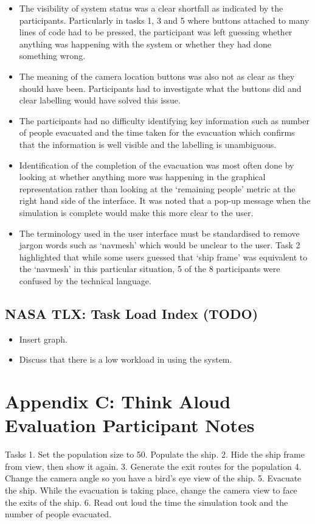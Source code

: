 \begin{itemize}
\item The visibility of system status was a clear shortfall as indicated by the participants. Particularly in tasks 1, 3 and 5 where buttons attached to many lines of code had to be pressed, the participant was left guessing whether anything was happening with the system or whether they had done something wrong.
\item The meaning of the camera location buttons was also not as clear as they should have been. Participants had to investigate what the buttons did and clear labelling would have solved this issue.
\item The participants had no difficulty identifying key information such as number of people evacuated and the time taken for the evacuation which confirms that the information is well visible and the labelling is unambiguous.
\item Identification of the completion of the evacuation was most often done by looking at whether anything more was happening in the graphical representation rather than looking at the `remaining people' metric at the right hand side of the interface. It was noted that a pop-up message when the simulation is complete would make this more clear to the user.
\item The terminology used in the user interface must be standardised to remove jargon words such as ‘navmesh’ which would be unclear to the user. Task 2 highlighted that while some users guessed that ‘ship frame’ was equivalent to the ‘navmesh’ in this particular situation, 5 of the 8 participants were confused by the technical language. 
\end{itemize}

\subsection{NASA TLX: Task Load Index (TODO)}
\begin{itemize}
\item Insert graph.
\item Discuss that there is a low workload in using the system.
\end{itemize}

\section{Appendix C: Think Aloud Evaluation Participant Notes}
Tasks
1. Set the population size to 50. Populate the ship.
2. Hide the ship frame from view, then show it again.
3. Generate the exit routes for the population
4. Change the camera angle so you have a bird’s eye view of the ship.
5. Evacuate the ship. While the evacuation is taking place, change the camera view to face the exits of the ship.
6. Read out loud the time the simulation took and the number of people evacuated.

